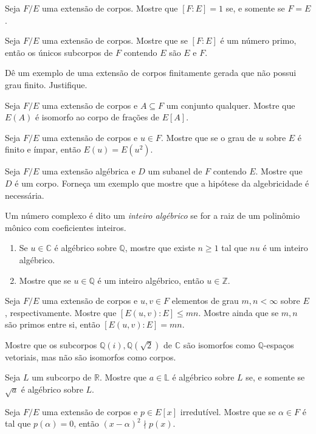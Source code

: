 \begin{exer}Seja $F/E$ uma extensão de corpos. Mostre que $[F:E]=1$ se, e somente se $F=E$.
\end{exer}
\begin{exer}Seja $F/E$ uma extensão de corpos. Mostre que se $[F:E]$ é um número primo, então os únicos subcorpos de $F$ contendo $E$ são $E$ e $F$.
\end{exer}
\begin{exer}Dê um exemplo de uma extensão de corpos finitamente gerada que não possui grau finito. Justifique.
\end{exer}
\begin{exer}Seja $F/E$ uma extensão de corpos e $A\subseteq F$ um conjunto qualquer. Mostre que $E(A)$ é isomorfo ao corpo de frações de $E[A]$.
\end{exer}
\begin{exer}Seja $F/E$ uma extensão de corpos e $u\in F$. Mostre que se o grau de $u$ sobre $E$ é finito e ímpar, então $E(u)=E(u^2)$.
\end{exer}
\begin{exer}Seja $F/E$ uma extensão algébrica e $D$ um subanel de $F$ contendo $E$. Mostre que $D$ é um corpo. Forneça um exemplo que mostre que a hipótese da algebricidade é necessária.
\end{exer}
\begin{exer}Um número complexo é dito um \emph{inteiro algébrico} se for a raiz de um polinômio mônico com coeficientes inteiros.

    \begin{enumerate}[label=(\alph*)]
        \item Se $u \in \mathbb C$ é algébrico sobre $\mathbb Q$, mostre que existe $n\geq 1$ tal que $nu$ é um inteiro algébrico.
        \item Mostre que se $u \in \mathbb Q$ é um inteiro algébrico, então $u \in \mathbb Z$.
    \end{enumerate}
\end{exer}
\begin{exer}
Seja $F/E$ uma extensão de corpos e $u, v \in F$ elementos de grau $m, n<\infty$ sobre $E$, respectivamente. Mostre que $[E(u, v):E]\leq mn$. Mostre ainda que se $m, n$ são primos entre si, então $[E(u, v):E]=mn$.
\end{exer}
\begin{exer}
Mostre que os subcorpos $\mathbb Q(i), \mathbb Q(\sqrt 2)$ de $\mathbb C$ são isomorfos como $\mathbb Q$-espaços vetoriais, mas não são isomorfos como corpos.
\end{exer}
\begin{exer}
Seja $L$ um subcorpo de $\mathbb R$. Mostre que $a \in \mathbb L$ é algébrico sobre $L$ se, e somente se $\sqrt a$ é algébrico sobre $L$.
\end{exer}
\begin{exer}
    Seja $F/E$ uma extensão de corpos e $p \in E[x]$ irredutível. Mostre que se $\alpha \in F$ é tal que $p(\alpha)=0$, então $(x-\alpha)^2\nmid p(x)$.
\end{exer}


